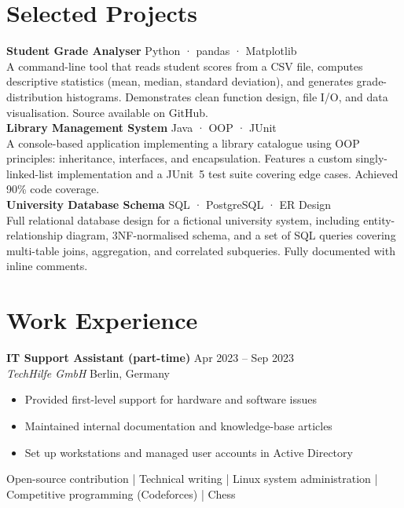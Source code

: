 \documentclass[11pt, a4paper]{article}
\newcommand{\cventry}[4]{%
  \textbf{#1} \hfill \textcolor{muted}{\small #2}\\
  \textit{\small #3} \hfill \textcolor{muted}{\small #4}\\
}
\newcommand{\cvproject}[3]{%
  \textbf{#1} \hfill \textcolor{muted}{\small #2}\\
  {\small #3}\\[4pt]
}
\begin{document}
\section{Selected Projects}

\cvproject{Student Grade Analyser}{Python · pandas · Matplotlib}
{%
  A command-line tool that reads student scores from a CSV file, computes
  descriptive statistics (mean, median, standard deviation), and generates
  grade-distribution histograms. Demonstrates clean function design, file
  I/O, and data visualisation. Source available on GitHub.
}

\cvproject{Library Management System}{Java · OOP · JUnit}
{%
  A console-based application implementing a library catalogue using OOP
  principles: inheritance, interfaces, and encapsulation. Features a custom
  singly-linked-list implementation and a JUnit~5 test suite covering
  edge cases. Achieved 90\% code coverage.
}

\cvproject{University Database Schema}{SQL · PostgreSQL · ER Design}
{%
  Full relational database design for a fictional university system, including
  entity-relationship diagram, 3NF-normalised schema, and a set of SQL queries
  covering multi-table joins, aggregation, and correlated subqueries.
  Fully documented with inline comments.
}

\section{Work Experience}

\cventry{IT Support Assistant (part-time)}{Apr 2023 -- Sep 2023}
        {TechHilfe GmbH}{Berlin, Germany}
\begin{itemize}[leftmargin=1.2em, itemsep=1pt, topsep=2pt]
  \item Provided first-level support for hardware and software issues
  \item Maintained internal documentation and knowledge-base articles
  \item Set up workstations and managed user accounts in Active Directory
\end{itemize}

Open-source contribution \quad|\quad
Technical writing \quad|\quad
Linux system administration \quad|\quad
Competitive programming (Codeforces) \quad|\quad
Chess
\end{document}
